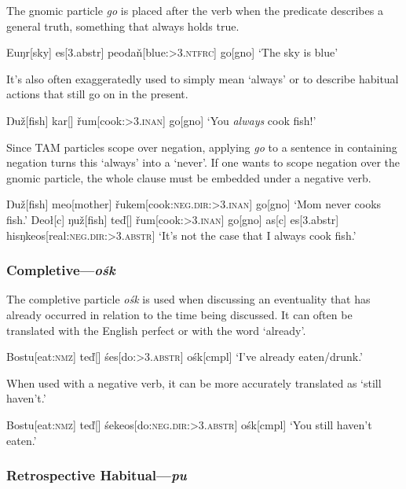 \documentclass[10pt]{article}
\newcommand{\sk}{\textsc}
\newcommand{\vd}{ď}
\newcommand{\vz}{ž}
\newcommand{\vr}{ř}
\newcommand{\vn}{ň}
\newcommand{\Engma}{Ŋ}
\newcommand{\engma}{ŋ}
\begin{document}
The gnomic particle \textit{go} is placed after the verb when the predicate describes a general truth, something that always holds true.

\ex
\begingl
Eu\engma r[sky]
es[\sc 3.abstr]
peoda\vn[blue:\sk{>3.ntfrc}]
go[\sc gno]
\glft `The sky is blue'
\endgl
\xe

It's also often exaggeratedly used to simply mean `always' or to describe habitual actions that still go on in the present.

\ex 
\begingl
\Engma u\vz[fish]
kar[]
\vr um[cook:\sk{>3.inan}]
go[\sc gno]
\nogloss{!}
\glft `You \emph{always} cook fish!'
\endgl
\xe

Since TAM particles scope over negation, applying \textit{go} to a sentence in containing negation turns this `always' into a `never'. If one wants to scope negation over the gnomic particle, the whole clause must be embedded under a negative verb.

\pex 
\a 
\begingl
\Engma u\vz[fish]
meo[mother]
\vr ukem[cook:\sk{neg.dir:>3.inan}]
go[\sc gno]
\glft `Mom never cooks fish.'
\endgl
\a 
\begingl
Deo\l[\sc c]
\engma u\vz[fish]
te\vd[]
\vr um[cook:\sk{>3.inan}]
go[\sc gno]
\nogloss{,}
as[\sc c]
es[\sc 3.abstr]
his\engma keos[real:\sk{neg.dir:>3.abstr}]
\glft `It's not the case that I always cook fish.'
\endgl
\xe

\subsubsection{Completive---\textit{o\'sk}}

The completive particle \textit{o\'sk} is used when discussing an eventuality that has already occurred in relation to the time being discussed. It can often be translated with the English perfect or with the word `already'.

\ex 
\begingl
Bostu[eat:\sk{nmz}]
te\vd[]
\'ses[do:\sk{>3.abstr}]
o\'sk[\sc cmpl]
\glft `I've already eaten/drunk.'
\endgl
\xe

When used with a negative verb, it can be more accurately translated as `still haven't.'

\ex 
\begingl
Bostu[eat:\sk{nmz}]
te\vd[]
\'sekeos[do:\sk{neg.dir:>3.abstr}]
o\'sk[\sc cmpl]
\glft `You still haven't eaten.'
\endgl
\xe

\subsubsection{Retrospective Habitual---\textit{pu}}
\end{document}

